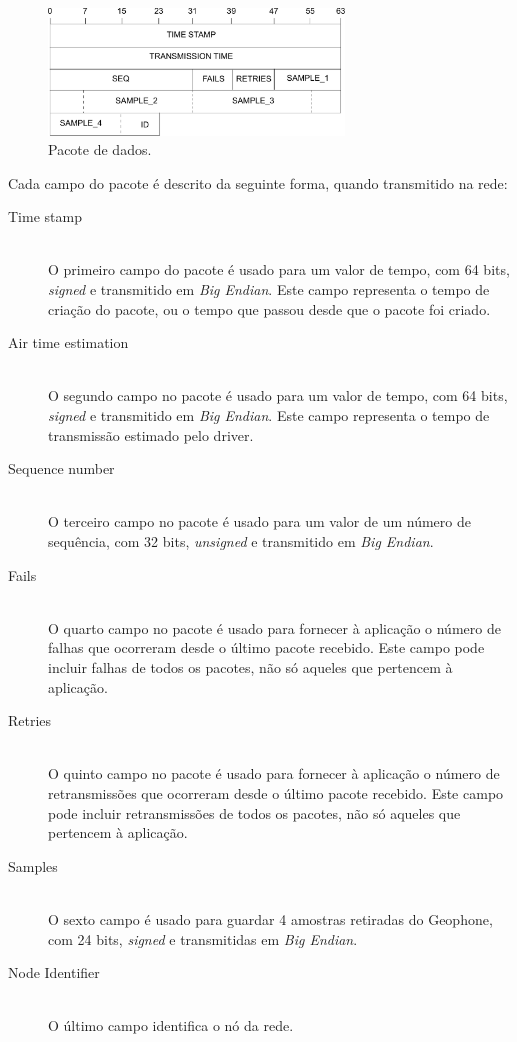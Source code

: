 \documentclass[10pt,a4paper,oneside]{book}
\begin{document}
	 \begin{figure}[h!]
   	  \centering
   	  \includegraphics[width=0.7\textwidth]{packet.pdf}
	  \caption{Pacote de dados.}
   	  \label{fig:packet}
 	\end{figure}

	Cada campo do pacote é descrito da seguinte forma, quando transmitido na rede:

 \begin{description}
   \item[Time stamp]\hfill\\
   	O primeiro campo do pacote é usado para um valor de tempo, com 64 bits, \emph{signed} e transmitido em \emph{Big Endian}. Este campo representa o tempo de criação do pacote, ou o tempo que passou desde que o pacote foi criado.
   \item[Air time estimation]\hfill\\
   	O segundo campo no pacote é usado para um valor de tempo, com 64 bits, \emph{signed} e transmitido em \emph{Big Endian}. Este campo representa o tempo de transmissão estimado pelo driver.
   \item[Sequence number]\hfill\\
   	O terceiro campo no pacote é usado para um valor de um número de sequência, com 32 bits, \emph{unsigned} e transmitido em \emph{Big Endian}.
   \item[Fails]\hfill\\
         O quarto campo no pacote é usado para fornecer à aplicação o número de falhas que ocorreram desde o último pacote recebido. Este campo pode incluir falhas de todos os pacotes, não só aqueles que pertencem à aplicação.
   \item[Retries]\hfill\\
         O quinto campo no pacote é usado para fornecer à aplicação o número de retransmissões que ocorreram desde o último pacote recebido. Este campo pode incluir retransmissões de todos os pacotes, não só aqueles que pertencem à aplicação.
   \item[Samples]\hfill\\
     O sexto campo é usado para guardar 4 amostras retiradas do Geophone, com 24 bits, \emph{signed} e transmitidas em \emph{Big Endian}.
    \item[Node Identifier]\hfill\\
	O último campo identifica o nó da rede.
 \end{description}
\end{document}
